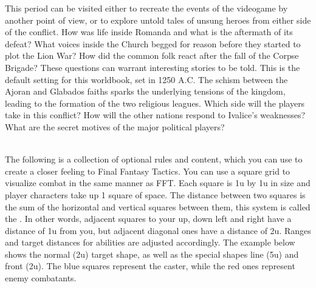 \begin{multicols}{2}
This period can be visited either to recreate the events of the videogame by another point of view, or to explore untold tales of unsung heroes from either side of the conflict.
How was life inside Romanda and what is the aftermath of its defeat? 
What voices inside the Church begged for reason before they started to plot the Lion War?
How did the common folk react after the fall of the Corpse Brigade? 
These questions can warrant interesting stories to be told.
%
\ofpar
%
This is the default setting for this worldbook, set in 1250 A.C.
The schism between the Ajoran and Glabados faiths sparks the underlying tensions of the kingdom, leading to the formation of the two religious leagues. 
Which side will the players take in this conflict? 
How will the other nations respond to Ivalice’s weaknesses? 
What are the secret motives of the major political players?
%
\end{multicols}
%
\vfill
%
\hspace*{\fill}\hspace*{\fill}\\
%
\twocolumn
\clearpage
%
%
The following is a collection of optional rules and content, which you can use to create a closer feeling to Final Fantasy Tactics.
%
\vfill
%
You can use a square grid to visualize combat in the same manner as FFT.
Each square is 1u by 1u in size and player characters take up 1 square of space.
The distance between two squares is the sum of the horizontal and vertical squares between them, this system is called the .
In other words, adjacent squares to your up, down left and right have a distance of 1u from you, but adjacent diagonal ones have a distance of 2u.
Ranges and target distances for abilities are adjusted accordingly.
The example below shows the normal (2u) target shape, as well as the special shapes line (5u) and front (2u). 
The blue squares represent the caster, while the red ones represent enemy combatants.
%
\vfill
%
